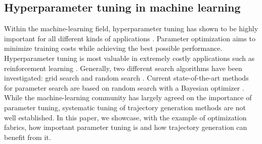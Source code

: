 \subsection{Hyperparameter tuning in machine learning}
%
Within the machine-learning field, hyperparameter tuning has shown to be highly 
important for all different kinds of applications \cite{yang2020hyperparameter,hutter_automated_2019,optuna}. 
Parameter optimization aims to minimize 
training costs while achieving the best possible performance. Hyperparameter tuning 
is most valuable in extremely
costly applications such as reinforcement learning \cite{zoph_neural_2017}. Generally, two different search
algorithms have been investigated: grid search and random search \cite{bergstra_random_nodate}.
Current state-of-the-art methods for parameter search are based on 
random search with a Bayesian optimizer \cite{optuna,bergstra_algorithms_nodate}.
While the machine-learning community has largely agreed on the importance of
parameter tuning, systematic tuning of trajectory generation methods are not well established. 
In this paper, we showcase, with the example of optimization fabrics, how important 
parameter tuning is and how trajectory generation can benefit from it.
